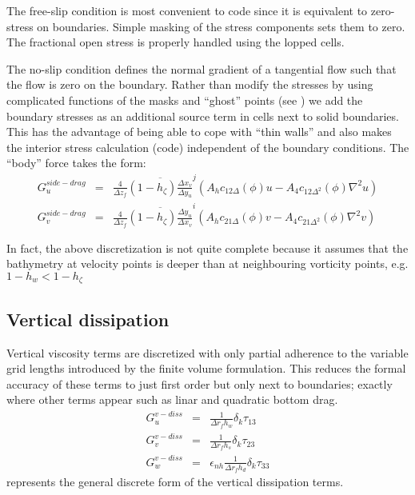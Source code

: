 The free-slip condition is most convenient to code since it is
equivalent to zero-stress on boundaries. Simple masking of the stress
components sets them to zero. The fractional open stress is properly
handled using the lopped cells.

The no-slip condition defines the normal gradient of a tangential flow
such that the flow is zero on the boundary. Rather than modify the
stresses by using complicated functions of the masks and ``ghost''
points (see \cite{Adcroft+Marshall98}) we add the boundary stresses as
an additional source term in cells next to solid boundaries. This has
the advantage of being able to cope with ``thin walls'' and also makes
the interior stress calculation (code) independent of the boundary
conditions. The ``body'' force takes the form:
\begin{eqnarray}
G_u^{side-drag} & = &
\frac{4}{\Delta z_f} \overline{ (1-h_\zeta) \frac{\Delta x_v}{\Delta y_u} }^j
\left( A_h c_{12\Delta}(\phi) u - A_4 c_{12\Delta^2}(\phi) \nabla^2 u \right)
\\
G_v^{side-drag} & = &
\frac{4}{\Delta z_f} \overline{ (1-h_\zeta) \frac{\Delta y_u}{\Delta x_v} }^i
\left( A_h c_{21\Delta}(\phi) v - A_4 c_{21\Delta^2}(\phi) \nabla^2 v \right)
\end{eqnarray}

In fact, the above discretization is not quite complete because it
assumes that the bathymetry at velocity points is deeper than at
neighbouring vorticity points, e.g. $1-h_w < 1-h_\zeta$



\subsection{Vertical dissipation}

Vertical viscosity terms are discretized with only partial adherence
to the variable grid lengths introduced by the finite volume
formulation. This reduces the formal accuracy of these terms to just
first order but only next to boundaries; exactly where other terms
appear such as linar and quadratic bottom drag.
\begin{eqnarray}
G_u^{v-diss} & = &
\frac{1}{\Delta r_f h_w} \delta_k \tau_{13} \\
G_v^{v-diss} & = &
\frac{1}{\Delta r_f h_s} \delta_k \tau_{23} \\
G_w^{v-diss} & = & \epsilon_{nh}
\frac{1}{\Delta r_f h_d} \delta_k \tau_{33}
\end{eqnarray}
represents the general discrete form of the vertical dissipation terms.

